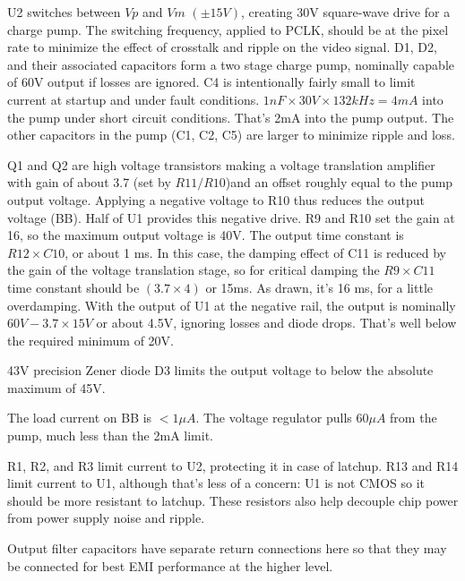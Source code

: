 \documentclass[a4paper,12pt]{article}
\begin{document}

U2 switches between $Vp$ and $Vm$ $(\pm15V)$, creating 30V square-wave drive for a charge pump. The switching frequency, applied to PCLK, should be at the pixel rate to minimize the effect of crosstalk and ripple on the video signal. D1, D2, and their associated capacitors form a two stage charge pump, nominally capable of 60V output if losses are ignored. C4 is intentionally fairly small to limit current at startup and under fault conditions. $1nF\times30V\times132kHz=4mA$ into the pump under short circuit conditions. That's 2mA into the pump output.
The other capacitors in the pump (C1, C2, C5) are larger to minimize ripple and loss.

Q1 and Q2 are high voltage transistors making a voltage translation amplifier with gain of about 3.7 (set by $R11/R10$)and an offset roughly equal to the pump output voltage. Applying a negative voltage to R10 thus reduces the output voltage (BB). Half of U1 provides this negative drive. R9 and R10 set the gain at 16, so the maximum output voltage is 40V. The output time constant is $R12\times C10$, or about 1 ms. In this case, the damping effect of C11 is reduced by the gain of the voltage translation stage, so for critical damping the $R9\times C11$ time constant should be $(3.7\times4)$ or 15ms. As drawn, it's 16 ms, for a little overdamping. With the output of U1 at the negative rail, the output is nominally $60V-3.7\times15V$ or about 4.5V, ignoring losses and diode drops. That's well below the required minimum of 20V.

43V precision Zener diode D3 limits the output voltage to below the absolute maximum of 45V.

The load current on BB is $<1\mu A$. The voltage regulator pulls $60\mu A$ from the pump, much less than the 2mA limit.

R1, R2, and R3 limit current to U2, protecting it in case of latchup. R13 and R14 limit current to U1, although that's less of a concern: U1 is not CMOS so it should be more resistant to latchup. These resistors also help decouple chip power from power supply noise and ripple.

Output filter capacitors have separate return connections here so that they may be connected for best EMI performance at the higher level.
\end{document}
